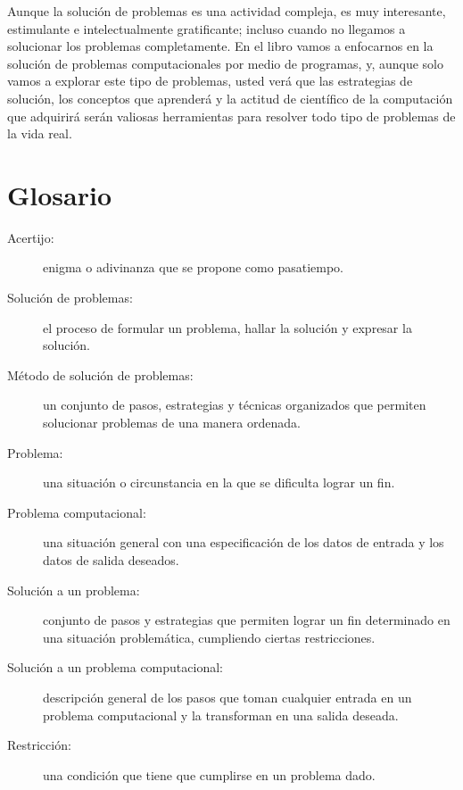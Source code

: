 Aunque la solución de problemas es una actividad compleja, es muy interesante,
estimulante e intelectualmente gratificante; incluso cuando no llegamos a solucionar
los problemas completamente. En el libro vamos a enfocarnos
en la solución de problemas computacionales por medio de programas, y, aunque
solo vamos a explorar este tipo de problemas, usted verá que las estrategias
de solución, los conceptos que aprenderá y la actitud de científico de la
computación que adquirirá serán valiosas herramientas para resolver todo tipo
de problemas de la vida real.


\section{Glosario}

\begin{description}

\item[Acertijo:] enigma o adivinanza que se propone como pasatiempo.

\item[Solución de problemas:]  el proceso de formular un problema,
hallar la solución y expresar la solución.

\item[Método de solución de problemas:] un conjunto de pasos, estrategias y técnicas
organizados que permiten solucionar problemas de una manera ordenada.

\item[Problema:] una situación o circunstancia en la que se dificulta lograr un
fin. 

\item[Problema computacional:] una situación general con una especificación de los 
datos de entrada y los datos de  salida deseados.

\item[Solución a un problema:] conjunto de pasos y estrategias que permiten lograr
un fin determinado en una situación problemática, cumpliendo ciertas restricciones.

\item[Solución a un problema computacional:] descripción general de los pasos
que toman cualquier entrada en un problema computacional y la transforman
en una salida deseada.

\item[Restricción:] una condición que tiene que cumplirse en un problema dado.

\end{description}

